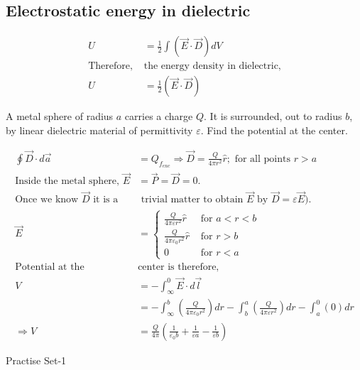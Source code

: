 \subsection{Electrostatic energy in dielectric}
\begin{align*}
U&=\frac{1}{2} \int(\vec{E} \cdot \vec{D}) d V\\
\text{Therefore, }&\text{the energy density in dielectric,} \\
U&=\frac{1}{2}(\vec{E} \cdot \vec{D})
\end{align*}
\begin{exercise}
	 A metal sphere of radius $a$ carries a charge $Q .$ It is surrounded, out to radius $b$, by
	linear dielectric material of permittivity $\varepsilon$. Find the potential at the center.
\end{exercise} 
\begin{answer}
	\begin{align*}
	 \oint \vec{D} \cdot d \vec{a}&=Q_{f_{e n c}} \Rightarrow \vec{D}=\frac{Q}{4 \pi r^{2}} \hat{r} ;\text{ for all points $r>a$}\\
	\text{Inside the metal sphere, }\vec{E}&=\vec{P}=\vec{D}=0 . \\
	\text{Once we know }\vec{D}\text{ it is a}&\text{ trivial matter to obtain }
	\vec{E}\text{ by }\vec{D}=\varepsilon \vec{E}) .\\
	\vec{E}&=\left\{\begin{array}{ll}
	\frac{Q}{4 \pi \varepsilon r^{2}} \hat{r} & \text { for } a<r<b \\
	\frac{Q}{4 \pi \varepsilon_{0} r^{2}} \hat{r} & \text { for } r>b \\
	0 & \text { for } r<a
	\end{array}\right.\\
	\text{Potential at the }&\text{center is therefore,}\\
	V&=-\int_{\infty}^{0} \vec{E} \cdot d \vec{l}\\&=-\int_{\infty}^{b}\left(\frac{Q}{4 \pi \varepsilon_{0} r^{2}}\right) d r-\int_{b}^{a}\left(\frac{Q}{4 \pi \varepsilon r^{2}}\right) d r-\int_{a}^{0}(0) d r \\\Rightarrow V&=\frac{Q}{4 \pi}\left(\frac{1}{\varepsilon_{0} b}+\frac{1}{\varepsilon a}-\frac{1}{\varepsilon b}\right)
	\end{align*}
\end{answer}
\newpage
\begin{abox}
Practise Set-1
\end{abox}
